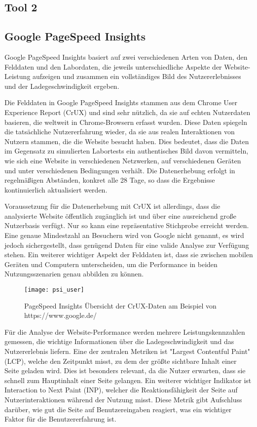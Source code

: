 \subsection{Tool 2}
\label{sec:}


\subsection{Google PageSpeed Insights}
\label{sec: pagespeed_insights}

Google PageSpeed Insights basiert auf zwei verschiedenen Arten von Daten, den Felddaten und den Labordaten, die jeweils unterschiedliche Aspekte der Website-Leistung aufzeigen und zusammen ein vollständiges Bild des Nutzererlebnisses und der Ladegeschwindigkeit ergeben.

Die Felddaten in Google PageSpeed Insights stammen aus dem Chrome User Experience Report (CrUX) und sind sehr nützlich, da sie auf echten Nutzerdaten basieren, die weltweit in Chrome-Browsern erfasst wurden. Diese Daten spiegeln die tatsächliche Nutzererfahrung wieder, da sie aus realen Interaktionen von Nutzern stammen, die die Website besucht haben. Dies bedeutet, dass die Daten im Gegensatz zu simulierten Labortests ein authentisches Bild davon vermitteln, wie sich eine Website in verschiedenen Netzwerken, auf verschiedenen Geräten und unter verschiedenen Bedingungen verhält. Die Datenerhebung erfolgt in regelmäßigen Abständen, konkret alle 28 Tage, so dass die Ergebnisse kontinuierlich aktualisiert werden.

Voraussetzung für die Datenerhebung mit CrUX ist allerdings, dass die analysierte Website öffentlich zugänglich ist und über eine ausreichend große Nutzerbasis verfügt. Nur so kann eine repräsentative Stichprobe erreicht werden. Eine genaue Mindestzahl an Besuchern wird von Google nicht genannt, es wird jedoch sichergestellt, dass genügend Daten für eine valide Analyse zur Verfügung stehen. Ein weiterer wichtiger Aspekt der Felddaten ist, dass sie zwischen mobilen Geräten und Computern unterscheiden, um die Performance in beiden Nutzungsszenarien genau abbilden zu können.

\begin{figure}
    \centering
    \texttt{[image: psi\_user]}
    \caption{PageSpeed Insights Übersicht der CrUX-Daten am Beispiel von https://www.google.de/}
    \label{fig:crux_data}
\end{figure}

Für die Analyse der Website-Performance werden mehrere Leistungskennzahlen gemessen, die wichtige Informationen über die Ladegeschwindigkeit und das Nutzererlebnis liefern. Eine der zentralen Metriken ist "Largest Contentful Paint" (LCP), welche den Zeitpunkt misst, zu dem der größte sichtbare Inhalt einer Seite geladen wird. Dies ist besonders relevant, da die Nutzer erwarten, dass sie schnell zum Hauptinhalt einer Seite gelangen. Ein weiterer wichtiger Indikator ist Interaction to Next Paint (INP), welcher die Reaktionsfähigkeit der Seite auf Nutzerinteraktionen während der Nutzung misst. Diese Metrik gibt Aufschluss darüber, wie gut die Seite auf Benutzereingaben reagiert, was ein wichtiger Faktor für die Benutzererfahrung ist.

